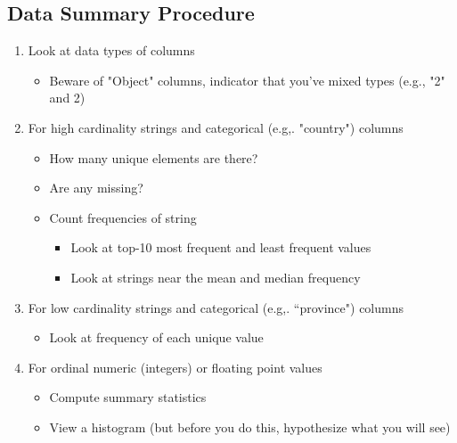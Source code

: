 \documentclass[11pt]{article}
\theoremstyle{definition}
\begin{document}
\subsection{Data Summary Procedure}
\begin{enumerate}
    \item Look at data types of columns
    \begin{itemize}
        \item Beware of "Object" columns, indicator that you've mixed types (e.g., "2" and 2)
    \end{itemize}
    \item For high cardinality strings and categorical (e.g,. "country") columns
    \begin{itemize}
        \item How many unique elements are there?
        \item Are any missing?
        \item Count frequencies of string
        \begin{itemize}
            \item Look at top-10 most frequent and least frequent values
            \item Look at strings near the mean and median frequency
        \end{itemize}
    \end{itemize}
    \item For low cardinality strings and categorical (e.g,. “province") columns
    \begin{itemize}
        \item Look at frequency of each unique value
    \end{itemize}
    \item For ordinal numeric (integers) or floating point values
    \begin{itemize}
        \item Compute summary statistics
        \item View a histogram (but before you do this, hypothesize what you will see)
    \end{itemize}
\end{enumerate}
\end{document}
